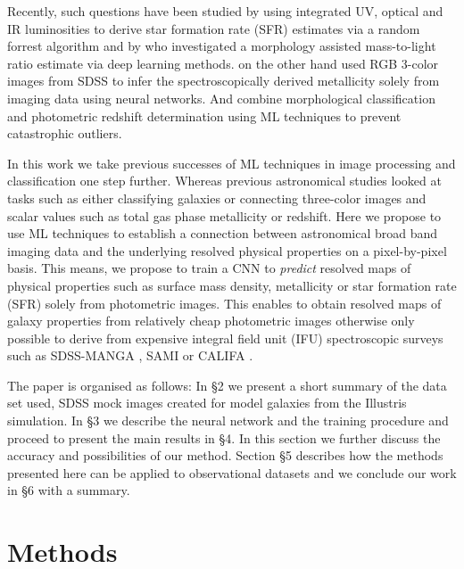 \documentclass[useAMS,usenatbib]{mnras}
\begin{document}
Recently, such questions have been studied by \citet{Bonjean2019} using integrated UV, optical and IR luminosities to derive star formation rate (SFR) estimates via a random forrest algorithm and by \citet{Dobbels2019} who investigated a morphology assisted mass-to-light ratio estimate via deep learning methods. \citet{Wu2019} on the other hand used RGB 3-color images from SDSS to infer the spectroscopically derived metallicity solely from imaging data using neural networks. And \citet{Diego2021} combine morphological classification and photometric redshift determination using ML techniques to prevent catastrophic outliers.

In this work we take previous successes of ML techniques in image processing and classification one step further. Whereas previous astronomical studies looked at tasks such as either classifying galaxies \citep[e.g.][]{Dominguez2018} or connecting three-color images and scalar values such as total gas phase metallicity \citep[e.g.][]{Wu2019} or redshift. Here we propose to use ML techniques to establish a connection between astronomical broad band imaging data and the underlying resolved physical properties on a pixel-by-pixel basis. This means, we propose to train a CNN to \textit{predict} resolved maps of physical properties such as surface mass density, metallicity or star formation rate (SFR) solely from photometric images. This enables to obtain resolved maps of galaxy properties from relatively cheap photometric images otherwise only possible to derive from expensive integral field unit (IFU) spectroscopic surveys such as SDSS-MANGA \citep{manga2015}, SAMI \citep{sami2015} or CALIFA \citep{califa2012}.

The paper is organised as follows: In \S2 we present a short summary of the data set used, SDSS mock images created for model galaxies from the Illustris simulation. In \S3 we describe the neural network and the training procedure and proceed to present the main results in \S4. In this section we further discuss the accuracy and possibilities of our method. Section \S5 describes how the methods presented here can be applied to observational datasets and we conclude our work in \S6 with a summary.


\section{Methods} \label{sec:method}
\end{document}
